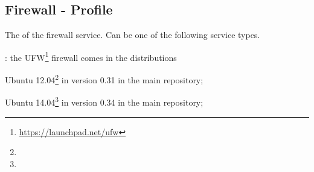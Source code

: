 \label{sec:firewall_profile}
\subsection{Firewall - Profile}


The  of the firewall service. Can be one of the following 
service types.
\begin{asparaitem}
%
\item[\qcode{ufw}:] 
the UFW\footnote{\url{https://launchpad.net/ufw}} firewall comes in the distributions 
\begin{compactitem}
\item[\TheDistribution{ubuntu}] Ubuntu 12.04\footnote{\TheUbuntuPreciseLTSDate} in version 0.31 in the main repository;
\item[\TheDistribution{ubuntu}] Ubuntu 14.04\footnote{\TheUbuntuTrustyLTSDate} in version 0.34 in the main repository;
\end{compactitem}
%
\end{asparaitem}

